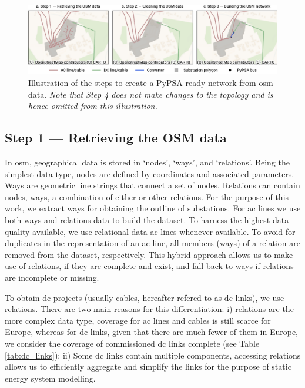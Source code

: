 \documentclass[fleqn,10pt]{wlscirep}
\let\autocite\cite
\begin{document}
\begin{figure}[!htbp]
    \centering
    \includegraphics{figures/fig_all_steps.pdf}
    \caption{Illustration of the steps to create a PyPSA-ready network from \gls{osm} data. \textit{Note that Step 4 does not make changes to the topology and is hence omitted from this illustration.}}
    \label{fig:all_steps}
\end{figure}

\subsection*{Step 1 --- Retrieving the OSM data}
In \gls{osm}, geographical data is stored in `nodes', `ways', and `relations'. Being the simplest data type, nodes are defined by coordinates and associated parameters. Ways are geometric line strings that connect a set of nodes. Relations can contain nodes, ways, a combination of either or other relations. \autocite{medjroubiOpenDataPower2017} For the purpose of this work, we extract ways for obtaining the outline of substations. For \acrshort{ac} lines we use both ways and relations data to build the dataset. To harness the highest data quality available, we use relational data \acrshort{ac} lines whenever available. To avoid for duplicates in the representation of an \acrshort{ac} line, all members (ways) of a relation are removed from the dataset, respectively. This hybrid approach allows us to make use of relations, if they are complete and exist, and fall back to ways if relations are incomplete or missing.

To obtain \acrshort{dc} projects (usually cables, hereafter refered to as \acrshort{dc} links), we use relations. There are two main reasons for this differentiation: i) relations are the more complex data type, coverage for \acrshort{ac} lines and cables is still scarce for Europe, whereas for \acrshort{dc} links, given that there are much fewer of them in Europe, we consider the coverage of commissioned \acrshort{dc} links complete (see Table \ref{tab:dc_links}); ii) Some \acrshort{dc} links contain multiple components, accessing relations allows us to efficiently aggregate and simplify the links for the purpose of static energy system modelling.
\end{document}
